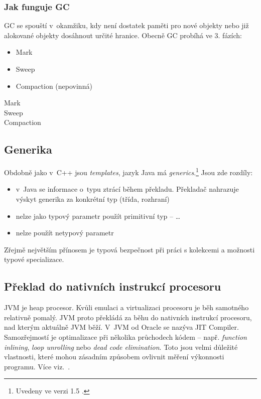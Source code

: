 \subsubsection{Jak funguje GC}
GC se spouští v~okamžiku, kdy není dostatek paměti pro nové objekty nebo již alokované objekty dosáhnout určité hranice. Obecně GC probíhá ve 3. fázích:
\begin{itemize}
  \item Mark
  \item Sweep
  \item Compaction (nepovinná)
\end{itemize}

\begin{description}
  \item[Mark] 
  \item[Sweep] 
  \item[Compaction]
\end{description}

\subsection{Generika}

Obdobně jako v~C++ jsou \emph{templates}\cite{ISO:2012:CPP}, jazyk Java má \emph{generics}.\footnote{Uvedeny ve verzi 1.5 \cite{gosling2013java}.}
Jsou zde rozdíly:
\begin{itemize}
  \item v~Java se informace o~typu ztrácí během překladu. Překladač nahrazuje výskyt generika za konkrétní typ (třída, rozhraní)
  \item nelze jako typový parametr použít primitivní typ --  \ldots{}
  \item nelze použít netypový parametr
\end{itemize}

Zřejmě největším přínosem je typová bezpečnost při práci s kolekcemi a možnosti typové specializace.

\subsection{Překlad \bytecode{} do nativních instrukcí procesoru}

JVM je heap procesor. Kvůli emulaci a virtualizaci procesoru je
běh samotného \bytecode{} relativně pomalý. JVM proto překládá
za běhu \bytecode{} do nativních instrukcí procesoru, nad kterým
aktuálně JVM běží. V~JVM od Oracle %
 se nazýva JIT Compiler\cite{hunt2011java}. Samozřejmostí je optimalizace při několika průchodech
kódem -- např. \emph{function inlining}, \emph{loop unrolling} nebo \emph{dead code elimination}\cite{hunt2011java}. Toto jsou velmi důležité vlastnosti, které mohou zásadním způsobem
ovlivnit měření výkonnosti programu. Více viz.~.


